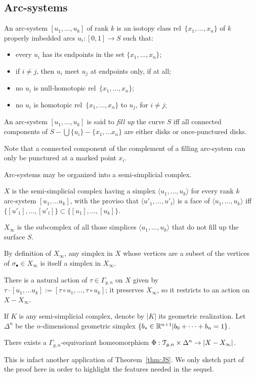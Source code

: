 \subsection{Arc-systems}
\label{sec:arc-systems}

\begin{definition}
  An arc-system $[u_1, \ldots, u_k]$ of rank $k$ is an isotopy class
  rel~$\{x_1, \ldots, x_n\}$ of $k$ properly imbedded arcs $u_i : [0,1] \to S$
  such that:
  \begin{itemize}
  \item every $u_i$ has its endpoints in the set $\{x_1, \ldots, x_n\}$;
  \item if $i \neq j$, then $u_i$ meet $u_j$ at endpoints only, if at all;
  \item no $u_i$ is null-homotopic rel~$\{x_1, \ldots, x_n\}$;
  \item no $u_i$ is homotopic rel~$\{x_1, \ldots, x_n\}$ to $u_j$, for $i \neq
    j$;
  \end{itemize}
  An arc-system $[u_1, \ldots, u_k]$ is said to \emph{fill up} the curve
  $S$ iff all connected components of $S - \bigcup\{u_i\} - \{x_1,\ldots x_n\}$ are
  either disks or once-punctured disks.
\end{definition}
Note that a connected component of the complement of a filling
arc-system can only be punctured at a marked point $x_i$.

Arc-systems may be organized into a semi-simplicial complex.
\begin{definition}
  $X$ is the semi-simplicial complex having a simplex $\langle u_1, \ldots, u_k\rangle$
  for every rank $k$ arc-system $[u_1, \ldots u_k]$, with the proviso that
  $\langle u'_1, \ldots, u'_l\rangle$ is a face of $\langle u_1, \ldots, u_k\rangle$ iff $\{ [u'_1], \ldots,
  [u'_l] \} \subset \{ [u_1], \ldots, [u_k] \}$.
  
  $X_\infty$ is the subcomplex of all those simplices $\langle u_1, \ldots, u_k\rangle$
  that do not fill up the surface $S$.
\end{definition}
By definition of $X_\infty$, any simplex in $X$ whose vertices are a subset
of the vertices of $\sigma_\bullet \in X_\infty$ is itself a simplex in $X_\infty$.

There is a natural action of $\tau \in \Gamma_{g,n}$ on $X$ given by $\tau \cdot [u_1, \ldots
u_k] := [\tau \circ u_1, \ldots, \tau \circ u_k]$; it preserves $X_\infty$, so it restricts to
an action on $X - X_\infty$.

If $K$ is any semi-simplicial complex, denote by $|K|$ its geometric
realization.  Let $\Delta^n$ be the $n$-dimensional geometric
simplex $\{ b_* \in \mathbb{R}^{n+1} | b_0 + \cdots + b_n = 1 \}$.
\begin{theorem}
  \label{thm:H}
  There exists a $\Gamma_{g,n}$-equivariant homeomorphism $\Phi: \mathcal{T}_{g,n} \times
  \Delta^n \to |X - X_\infty|$.
\end{theorem}
This is infact another application of Theorem~\ref{thm:JS}.  We only sketch
part of the proof here in order to highlight the features needed in the
sequel. 


